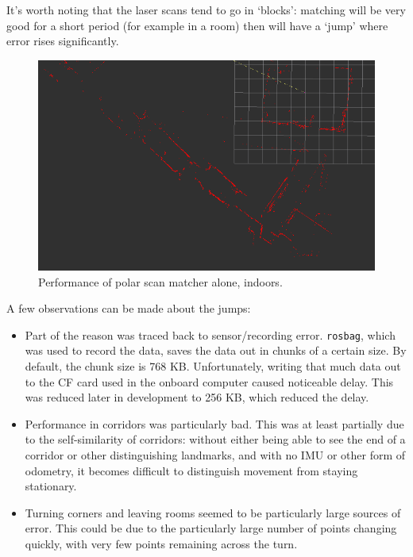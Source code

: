 \documentclass[12pt,oneside,a4paper]{book}
\begin{document}
It's worth noting that the laser scans tend to go in `blocks':
matching will be very good for a short period (for example in a room)
then will have a `jump' where error rises significantly.

\begin{figure}[h!]
  \centering
  \includegraphics[width=\textwidth]{figs/indoor}
  \caption{Performance of polar scan matcher alone, indoors.}
  \label{fig:psm-indoors}
\end{figure}

A few observations can be made about the jumps:
\begin{itemize}
\item Part of the reason was traced back to sensor/recording
  error. \texttt{rosbag}, which was used to record the data, saves the
  data out in chunks of a certain size. By default, the chunk size is
  768 KB. Unfortunately, writing that much data out to the CF card
  used in the onboard computer caused noticeable delay. This was
  reduced later in development to 256 KB, which reduced the delay.
\item Performance in corridors was particularly bad. This was at least
  partially due to the self-similarity of corridors: without either
  being able to see the end of a corridor or other distinguishing
  landmarks, and with no IMU or other form of odometry, it becomes
  difficult to distinguish movement from staying stationary.
\item Turning corners and leaving rooms seemed to be particularly
  large sources of error. This could be due to the particularly large
  number of points changing quickly, with very few points remaining
  across the turn.
\end{itemize}
\end{document}
